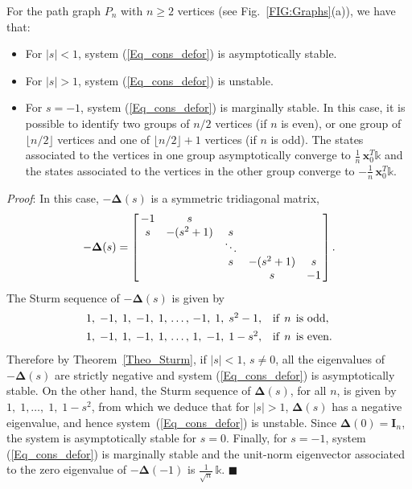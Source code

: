 \documentclass[letterpaper,9pt,twocolumn]{autart}
\newcommand{\vet}[1]{\ensuremath{{\mathbf #1}}}
\begin{document}
\begin{proposition}\label{Prop_path}
For the path graph $P_n$ with $n \geq 2$ vertices (see Fig.~\ref{FIG:Graphs}(a)), we have that:
\begin{itemize}
\item For $|s| < 1$, system (\ref{Eq_cons_defor}) is asymptotically stable.
\item For $|s| > 1$, system (\ref{Eq_cons_defor}) is unstable.
\item For $s = -1$, system (\ref{Eq_cons_defor}) is marginally stable.
In this case, it is possible to identify two groups of $n/2$ vertices
(if $n$ is even), or one group of $\lfloor n/2 \rfloor$ vertices
and one of $\lfloor n/2 \rfloor + 1$ vertices (if $n$ is odd).
The states associated to the vertices in one group asymptotically
converge to $\frac{1}{n}\,\vet{x}_0^T\mathds{k}$
and the states associated to the vertices in the other group
converge to $-\frac{1}{n}\,\vet{x}_0^T \mathds{k}$.
\end{itemize}
\emph{Proof}:
In this case, $-\boldsymbol{\Delta}(s)$ is a symmetric tridiagonal matrix,
$$
-\boldsymbol{\Delta}(s) = \left[\,
  \begin{matrix}
    -1 & s & & &\\ s & -(s^2 + 1) & s & &\vspace{-0.12cm}\\
     & & \ddots & &\vspace{-0.04cm}\\ & & s & -(s^2 + 1) & s\\
     & & & s & -1
  \end{matrix}
\,\right].
$$
The Sturm sequence of $-\boldsymbol{\Delta}(s)$ is given by
$$
\begin{array}{ll}
1,\;-1,\;1,\;-1,\;1,\,\ldots,\,-1,\;1,\;s^2 - 1, & \text{if}\;\, n\;\, \text{is odd},\vspace{0.15cm}\\
1,\;-1,\;1,\;-1,\;1,\,\ldots,\,1,\;-1,\;1 - s^2, & \text{if}\;\, n\;\, \text{is even}.
\end{array}
$$
Therefore by Theorem~\ref{Theo_Sturm}, if $|s| < 1$, $s \neq 0$,
all the eigenvalues of $-\boldsymbol{\Delta}(s)$ are strictly negative and
system (\ref{Eq_cons_defor}) is asymptotically stable. On the other hand,
the Sturm sequence of $\boldsymbol{\Delta}(s)$, for all $n$, is given by $1,\;1,\ldots,\;1,\;1 - s^2$,
from which we deduce that for $|s| > 1$, $\boldsymbol{\Delta}(s)$ has a negative eigenvalue, and
hence system~(\ref{Eq_cons_defor}) is unstable.
Since $\boldsymbol{\Delta}(0) = \vet{I}_n$, the system
is asymptotically stable for $s = 0$. Finally, for $s = -1$, system (\ref{Eq_cons_defor})
is marginally stable and the unit-norm
eigenvector associated to the zero eigenvalue of $-\boldsymbol{\Delta}(-1)$ is $\frac{1}{\sqrt{n}}\,\mathds{k}$.
\hfill$\blacksquare$
\end{proposition}
\end{document}
